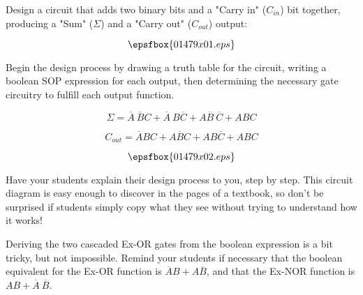 

Design a circuit that adds two binary bits and a "Carry in" ($C_{in}$) bit together, producing a "Sum" ($\Sigma$) and a "Carry out" ($C_{out}$) output:

$$\epsfbox{01479x01.eps}$$

Begin the design process by drawing a truth table for the circuit, writing a boolean SOP expression for each output, then determining the necessary gate circuitry to fulfill each output function.







$$\Sigma = \overline{A} \> \overline{B} C + \overline{A} \> B \overline{C} + A \overline{B} \> \overline{C} + ABC$$ 

$$C_{out} = \overline{A}BC + A\overline{B}C + AB\overline{C} + ABC$$

$$\epsfbox{01479x02.eps}$$







Have your students explain their design process to you, step by step.  This circuit diagram is easy enough to discover in the pages of a textbook, so don't be surprised if students simply copy what they see without trying to understand how it works!

Deriving the two cascaded Ex-OR gates from the boolean expression is a bit tricky, but not impossible.  Remind your students if necessary that the boolean equivalent for the Ex-OR function is $\overline{A}B + A\overline{B}$, and that the Ex-NOR function is $AB + \overline{A} \> \overline{B}$.




